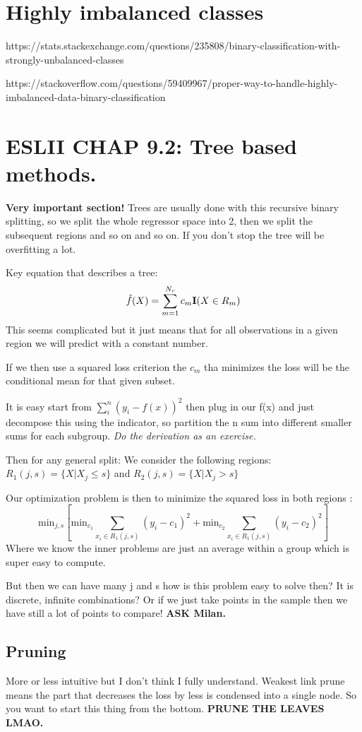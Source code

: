 \documentclass{article}
\begin{document}
\section{Highly imbalanced classes}
https://stats.stackexchange.com/questions/235808/binary-classification-with-strongly-unbalanced-classes

https://stackoverflow.com/questions/59409967/proper-way-to-handle-highly-imbalanced-data-binary-classification

\section{ESLII CHAP 9.2: Tree based methods.}
\textbf{Very important section!}
Trees are usually done with this recursive binary splitting, so we split the whole regressor space into 2, then we split the subsequent regions and so on and so on. If you don't stop the tree will be overfitting a lot.

Key equation that describes a tree: 
$$\hat{f}(X) = \sum_{m=1}^{N_r} c_m \textrm{\textbf{I}}(X \in R_m)$$
This seems complicated but it just means that for all observations in a given region we will predict with a constant number.

If we then use a squared loss criterion the $c_m$ tha minimizes the loss will be the conditional mean for that given subset.

It is easy start from $\sum_i^n(y_i -f(x))^2$ then plug in our f(x) and just decompose this using the indicator, so partition the n sum into different smaller sums for each subgroup.
\textit{Do the derivation as an exercise.}

Then for any general split:
We consider the following regions: $R_1(j,s) = \{ X| X_j \leq s \}$ and $R_2(j,s) = \{ X| X_j > s \}$

Our optimization problem is then to minimize the squared loss in both regions : 
$$ \textrm{min}_{j,s}[\textrm{min}_{c_1} \sum_{x_i \in R_1(j,s)}(y_i-c_1)^2 + \textrm{min}_{c_2} \sum_{x_i \in R_1(j,s)}(y_i-c_2)^2  ]$$
Where we know the inner problems are just an average within a group which is super easy to compute.

But then we can have many j and s how is this problem easy to solve then? It is discrete, infinite combinations? Or if we just take points in the sample then we have still a lot of points to compare! \textbf{ASK Milan.}

\subsection{Pruning}
More or less intuitive but I don't think I fully understand. Weakest link prune means the part that decreases the loss by less is condensed into a single node. So you want to start this thing from the bottom. \textbf{PRUNE THE LEAVES LMAO.}
\end{document}
